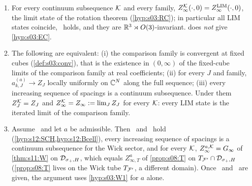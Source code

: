 \begin{proposition}[identification]\label{prop:s12:ID}
\begin{enumerate}[label=\textup{(\alph*)},leftmargin=*,nosep]
\item For every continuum subsequence $\mathcal K$ and every family, $Z^{\mathcal K}_{\infty}(\cdot,0)=Z^{\mathrm{LIM}}_\infty(\cdot,0)$, the limit state of the rotation theorem (\cref{hyp:s03:RC}); in particular all LIM states coincide, \UNIQ\ holds, and they are $\mathbb R^3\rtimes O(3)$-invariant.  does \emph{not} give \cref{hyp:s03:EC}.
\item The following are equivalent: (i) the comparison family is convergent at fixed cubes (\cref{def:s03:conv}), that is the existence in $(0,\infty)$ of the fixed-cube limits of the comparison family at real coefficients; (ii) for every $J$ and family, $a^{(a)}_{k,J}\to Z_J$ locally uniformly on $\mathbb C^N$ along the full sequence; (iii) every increasing sequence of spacings is a continuum subsequence. Under them $Z^{\mathcal K}_J=Z_J$ and $Z^{\mathcal K}_{\infty}=Z_\infty:=\lim_JZ_J$ for every $\mathcal K$: every LIM state is the iterated limit of the comparison family.
\item Assume \Tthree\ and let $a$ be admissible. Then \SCH\ and \Bcell\ hold (\cref{hyp:s12:SCH,hyp:s12:Bcell}), every increasing sequence of spacings is a continuum subsequence for the Wick sector, and for every $\mathcal K$, $Z^{a,\mathcal K}_\infty=G_\infty$ of \cref{thm:s11:W} on $\mathcal D_{\sigma_+,H}$, which equals $Z^a_{\infty,T}$ of \cref{prop:s08:T} on $T_{\mathcal F'}\cap\mathcal D_{\sigma_+,H}$ (\cref{prop:s08:T} lives on the Wick tube $T_{\mathcal F'}$, a different domain). Once \SCH\ and \Bcell\ are given, the argument uses \cref{hyp:s03:W1} for $a$ alone.
\end{enumerate}
\end{proposition}

